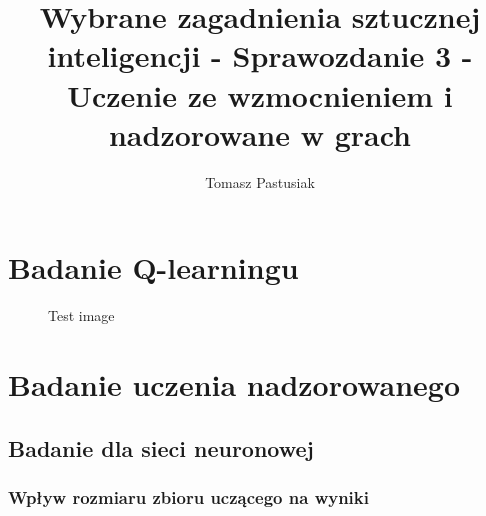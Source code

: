 \documentclass{article}
\title{Wybrane zagadnienia sztucznej inteligencji - Sprawozdanie 3 - Uczenie ze wzmocnieniem i nadzorowane w grach}
\author{Tomasz Pastusiak \And{Leszek Kawecki}}
\begin{document}

\maketitle


\section{Badanie Q-learningu}

\begin{figure}[H]
  \centering
  \caption{Test image}
  \label{fig:ackley_10_100}
\end{figure}

\section{Badanie uczenia nadzorowanego}

\subsection{Badanie dla sieci neuronowej}

\subsubsection{Wpływ rozmiaru zbioru uczącego na wyniki}
\end{document}
